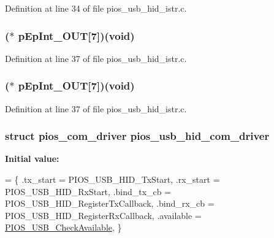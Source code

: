 Definition at line 34 of file pios\-\_\-usb\-\_\-hid\-\_\-istr.\-c.

\hypertarget{group___p_i_o_s___u_s_b___h_i_d_ga549396ff4348c565f52117dd27ad52ca}{
\subsubsection[{p\-Ep\-Int\-\_\-\-O\-U\-T}]{($\ast$ p\-Ep\-Int\-\_\-\-O\-U\-T\mbox{[}7\mbox{]})({\bf void})}}\label{group___p_i_o_s___u_s_b___h_i_d_ga549396ff4348c565f52117dd27ad52ca}


Definition at line 37 of file pios\-\_\-usb\-\_\-hid\-\_\-istr.\-c.

\hypertarget{group___p_i_o_s___u_s_b___h_i_d_ga549396ff4348c565f52117dd27ad52ca}{
\subsubsection[{p\-Ep\-Int\-\_\-\-O\-U\-T}]{($\ast$ p\-Ep\-Int\-\_\-\-O\-U\-T\mbox{[}7\mbox{]})({\bf void})}}\label{group___p_i_o_s___u_s_b___h_i_d_ga549396ff4348c565f52117dd27ad52ca}


Definition at line 37 of file pios\-\_\-usb\-\_\-hid\-\_\-istr.\-c.

\hypertarget{group___p_i_o_s___u_s_b___h_i_d_ga7bc5f832e095cad60f463436e377bb5d}{
\subsubsection[{pios\-\_\-usb\-\_\-hid\-\_\-com\-\_\-driver}]{\setlength{\rightskip}{0pt plus 5cm}struct {\bf pios\-\_\-com\-\_\-driver} pios\-\_\-usb\-\_\-hid\-\_\-com\-\_\-driver}}\label{group___p_i_o_s___u_s_b___h_i_d_ga7bc5f832e095cad60f463436e377bb5d}
{\bfseries Initial value\-:}
\begin{DoxyCode}
= \{
        .tx\_start    = PIOS\_USB\_HID\_TxStart,
        .rx\_start    = PIOS\_USB\_HID\_RxStart,
        .bind\_tx\_cb  = PIOS\_USB\_HID\_RegisterTxCallback,
        .bind\_rx\_cb  = PIOS\_USB\_HID\_RegisterRxCallback,
        .available   = \hyperlink{group___p_i_o_s___u_s_b_gab421c578c5d8da4eff14b6ce21c0cb5f}{PIOS\_USB\_CheckAvailable},
\}
\end{DoxyCode}


